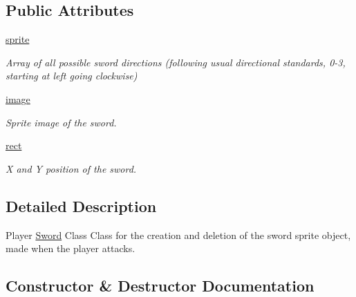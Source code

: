 \subsection*{Public Attributes}
\begin{DoxyCompactItemize}
\item 
\mbox{\label{classactor_1_1sword_1_1_sword_a4647017ca649b12ca382614b3af59827}} 
\hyperlink{classactor_1_1sword_1_1_sword_a4647017ca649b12ca382614b3af59827}{sprite}
\begin{DoxyCompactList}\small\item\em Array of all possible sword directions (following usual directional standards, 0-\/3, starting at left going clockwise) \end{DoxyCompactList}\item 
\hyperlink{classactor_1_1sword_1_1_sword_a9fd392562552eb7009662bd7e6701148}{image}
\begin{DoxyCompactList}\small\item\em Sprite image of the sword. \end{DoxyCompactList}\item 
\mbox{\label{classactor_1_1sword_1_1_sword_ae79e5ac458440b092db89e72c26c2aa6}} 
\hyperlink{classactor_1_1sword_1_1_sword_ae79e5ac458440b092db89e72c26c2aa6}{rect}
\begin{DoxyCompactList}\small\item\em X and Y position of the sword. \end{DoxyCompactList}\end{DoxyCompactItemize}


\subsection{Detailed Description}
Player \hyperlink{classactor_1_1sword_1_1_sword}{Sword} Class  Class for the creation and deletion of the sword sprite object, made when the player attacks. 

\subsection{Constructor \& Destructor Documentation}
\mbox{\label{classactor_1_1sword_1_1_sword_a311383f1e990c512b78b02c1b28cd7ea}} 
